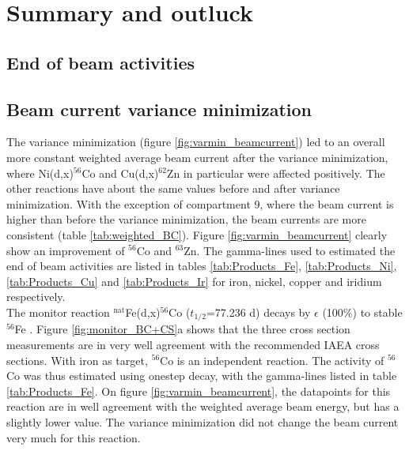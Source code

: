 \documentclass[a4paper,11pt,twoside]{book}
\begin{document}
\chapter{Summary and outluck}

\section{End of beam activities}

\section{Beam current variance minimization}

The variance minimization (figure \ref{fig:varmin_beamcurrent}) led to an overall more constant weighted average beam current after the variance minimization, where Ni(d,x)$^{56}$Co and Cu(d,x)$^{62}$Zn in particular were affected positively. The other reactions have about the same values before and after variance minimization. With the exception of compartment 9, where the beam current is higher than before the variance minimization, the beam currents are more consistent (table \ref{tab:weighted_BC}). Figure \ref{fig:varmin_beamcurrent} clearly show an improvement of $^{56}$Co and $^{63}$Zn. The gamma-lines used to estimated the end of beam activities are listed in tables \ref{tab:Products_Fe}, \ref{tab:Products_Ni}, \ref{tab:Products_Cu} and \ref{tab:Products_Ir} for iron, nickel, copper and iridium respectively. \\ 

\noindent
The monitor reaction  $^\text{nat}$Fe(d,x)$^{56}$Co ($t_{1/2}$=77.236 d) decays by $\epsilon$ (100\%) to stable $^{56}$Fe \cite{Junde2011}. Figure \ref{fig:monitor_BC+CS}a shows that the three cross section measurements are in very well agreement with the recommended IAEA cross sections. With iron as target, $^{56}$Co is an independent reaction. The activity of $^{56}$Co was thus estimated using onestep decay, with the gamma-lines listed in table \ref{tab:Products_Fe}. On figure \ref{fig:varmin_beamcurrent}, the datapoints for this reaction are in well agreement with the weighted average beam energy, but has a slightly lower value. The variance minimization did not change the beam current very much for this reaction. \\
\end{document}
